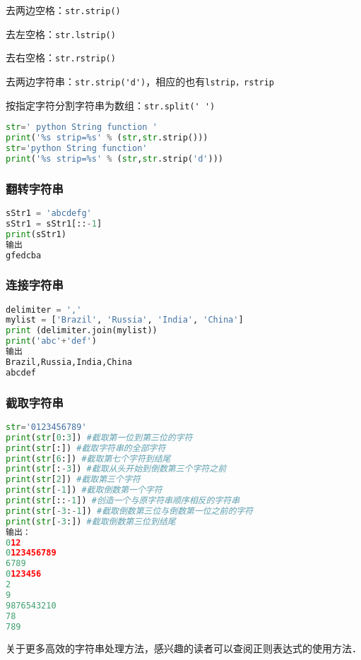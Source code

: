 去两边空格：\verb|str.strip()|

去左空格：\verb|str.lstrip()|

去右空格：\verb|str.rstrip()|

去两边字符串：\verb|str.strip('d')|，相应的也有\verb|lstrip，rstrip|

按指定字符分割字符串为数组：\verb|str.split(' ')|

\begin{lstlisting}[language=python]
str=' python String function '
print('%s strip=%s' % (str,str.strip()))
str='python String function'
print('%s strip=%s' % (str,str.strip('d')))
\end{lstlisting}



\subsubsection{翻转字符串}
\begin{lstlisting}[language=python]
sStr1 = 'abcdefg'
sStr1 = sStr1[::-1]
print(sStr1)
输出
gfedcba
\end{lstlisting}

\subsubsection{连接字符串}
\begin{lstlisting}[language=python]
delimiter = ','
mylist = ['Brazil', 'Russia', 'India', 'China']
print (delimiter.join(mylist))
print('abc'+'def')
输出
Brazil,Russia,India,China
abcdef
\end{lstlisting}

\subsubsection{截取字符串}
\begin{lstlisting}[language=python]
str='0123456789'
print(str[0:3]) #截取第一位到第三位的字符
print(str[:]) #截取字符串的全部字符
print(str[6:]) #截取第七个字符到结尾
print(str[:-3]) #截取从头开始到倒数第三个字符之前
print(str[2]) #截取第三个字符
print(str[-1]) #截取倒数第一个字符
print(str[::-1]) #创造一个与原字符串顺序相反的字符串
print(str[-3:-1]) #截取倒数第三位与倒数第一位之前的字符
print(str[-3:]) #截取倒数第三位到结尾
输出：
012
0123456789
6789
0123456
2
9
9876543210
78
789
\end{lstlisting}


关于更多高效的字符串处理方法，感兴趣的读者可以查阅正则表达式的使用方法．
